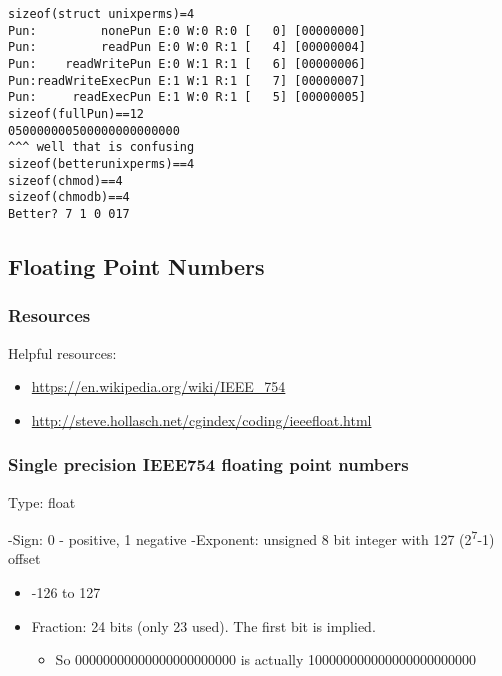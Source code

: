 \documentclass[11pt]{article}
\begin{document}
\begin{enumerate}
\begin{verbatim}
\end{verbatim}

\begin{verbatim}
sizeof(struct unixperms)=4
Pun:         nonePun E:0 W:0 R:0 [   0] [00000000]
Pun:         readPun E:0 W:0 R:1 [   4] [00000004]
Pun:    readWritePun E:0 W:1 R:1 [   6] [00000006]
Pun:readWriteExecPun E:1 W:1 R:1 [   7] [00000007]
Pun:     readExecPun E:1 W:0 R:1 [   5] [00000005]
sizeof(fullPun)==12
050000000500000000000000
^^^ well that is confusing
sizeof(betterunixperms)==4
sizeof(chmod)==4
sizeof(chmodb)==4
Better? 7 1 0 017
\end{verbatim}
\end{enumerate}

\subsection{Floating Point Numbers}
\label{sec:orgf1fbda1}

\subsubsection{Resources}
\label{sec:org9e4513e}

Helpful resources:
\begin{itemize}
\item \url{https://en.wikipedia.org/wiki/IEEE\_754}
\item \url{http://steve.hollasch.net/cgindex/coding/ieeefloat.html}
\end{itemize}

\subsubsection{Single precision IEEE754 floating point numbers}
\label{sec:org5b5e23e}

Type: float

-Sign: 0 - positive, 1 negative
-Exponent: unsigned 8 bit integer with 127 (2\textsuperscript{7}-1) offset
\begin{itemize}
\item -126 to 127
\end{itemize}
\begin{itemize}
\item Fraction: 24 bits (only 23 used). The first bit is implied. 
\begin{itemize}
\item So 00000000000000000000000 is actually 100000000000000000000000
\end{itemize}
\end{itemize}
\end{document}
